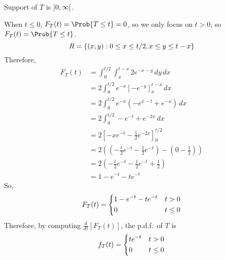 \begin{Example}{}{}
\begin{enumerate}[label=(\roman*)]
              Support of $ T $ is $ \interval[open]{0}{\infty} $.

              When $ t\le 0 $, $ F_T(t)=\Prob{T\le t}=0 $,
              so we only focus on $ t>0 $, so $ F_T(t)=\Prob{T\le t} $.
              \[ R=\{(x,y):0\le x\le t/2, x\le y\le t-x\} \]
              Therefore,
              \begin{align*}
                  F_T(t)
                   & = \int_{0}^{t/2} \int_{x}^{t-x} 2e^{-x-y}\, d{y} \, d{x}             \\
                   & =2 \int_{0}^{t/2} e^{-x}\left[ -e^{-y} \right]_x^{t-x}\, d{x}        \\
                   & =2 \int_{0}^{t/2} e^{-x}\left( -e^{x-t}+e^{-x} \right)\, d{x}        \\
                   & =2 \int_{0}^{t/2} -e^{-t}+e^{-2x}\, d{x}                             \\
                   & =2\left[ -xe^{-t}-\frac{1}{2}e^{-2x} \right]_0^{t/2}                 \\
                   & =2\left( \left( -\frac{t}{2} e^{-t} -\frac{1}{2} e^{-t}\right)
                  -\left( 0-\frac{1}{2}  \right) \right)                                  \\
                   & =2\left( -\frac{t}{2} e^{-t}-\frac{1}{2} e^{-t}+\frac{1}{2}  \right) \\
                   & =1-e^{-t}-te^{-t}
              \end{align*}
              So,
              \[ F_T(t)=
                  \begin{dcases}
                      1-e^{-t}-te^{-t} & t>0    \\
                      0                & t\le 0
                  \end{dcases} \]
              Therefore, by computing $ \displaystyle
                  \frac{d}{dt}[F_T(t)] $, the p.d.f.\ of $ T $ is
              \[ f_T(t)=
                  \begin{dcases}
                      te^{-t} & t> 0   \\
                      0       & t\le 0
                  \end{dcases} \]
    \end{enumerate}
\end{Example}
